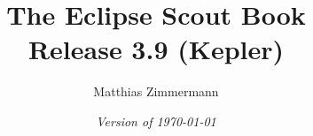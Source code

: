 
\author{Matthias Zimmermann}
\title{\Huge\textbf{The Eclipse Scout Book} \\
\huge Release 3.9 (Kepler)}
\ifpdf
  \isodate
\fi
\date{\emph{Version of \today}}
\maketitle

